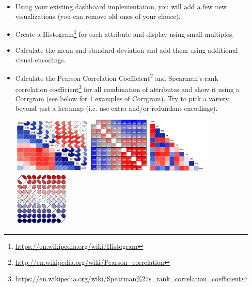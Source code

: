 \documentclass[a4paper,12pt]{article}
\begin{document}
\begin{itemize}

\item Using your existing dashboard implementation, you will add a few new visualizations (you can remove old ones of your choice).

\item Create a Histogram\footnote{\url{https://en.wikipedia.org/wiki/Histogram}} for each attribute and display using small multiples.

\item Calculate the mean and standard deviation and add them using additional visual encodings.

\item Calculate the Pearson Correlation Coefficient\footnote{\url{http://en.wikipedia.org/wiki/Pearson_correlation}} and Spearman's rank correlation coefficient\footnote{\url{https://en.wikipedia.org/wiki/Spearman\%27s_rank_correlation_coefficient}} for all combination of attributes and show it using a Corrgram (see below for 4 examples of Corrgram). Try to pick a variety beyond just a heatmap (i.e. use extra and/or redundant encodings).

\vspace{15pt}
 \hfill
\includegraphics[height=80pt]{../images/corrgram1.png} \hfill
\includegraphics[height=80pt]{../images/corrgram2.png} \hfill
\includegraphics[height=80pt]{../images/corrgram3.png} \hfill
\includegraphics[height=80pt]{../images/corrgram4.png} \hfill
\vspace{10pt}


\end{itemize}
\end{document}
